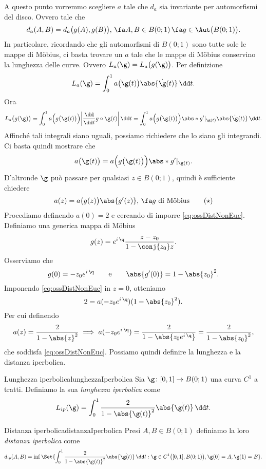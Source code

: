 \begin{oss}
	A questo punto vorremmo scegliere \(a\) tale che \(d_a\) sia invariante per automorfismi del disco. Ovvero tale che
	\[
		d_a(A,B) = d_a\big(g(A),g(B)\big),\,\fa A,B\in B(0;1)\,\fa g\in\Aut\big(B(0;1)\big).
	\]
	In particolare, ricordando che gli automorfismi di \(B(0;1)\) sono tutte sole le mappe di M\"obius, ci basta trovare un \(a\) tale che le mappe di M\"obius conservino la lunghezza delle curve. Ovvero \(L_a(\g)=L_a\big(g(\g)\big)\).
	Per definizione
	\[
		L_a(\g) = \int_0^1 a\big(\g(t)\big)\abs{\dot{\g}(t)}\,\dd t.
	\]
	Ora
	\[
		L_a\big(g(\g)\big) = \int_0^1 a\Big(g\big(\g(t)\big)\Big) \bigg\lvert \frac{\dd}{\dd t} g\circ \g(t) \bigg\rvert\,\dd t = \int_0^1 a\Big(g\big(\g(t)\big)\Big) \abs*{g'|_{\g(t)}}\abs{\dot{\g}(t)}\,\dd t.
	\]
	Affinché tali integrali siano uguali, possiamo richiedere che lo siano gli integrandi. Ci basta quindi mostrare che
	\[
		a\big(\g(t)\big) = a\Big(g\big(\g(t)\big)\Big)\abs*{g'|_{\g(t)}}.
	\]
	D'altronde \(\g\) può passare per qualsiasi \(z\in B(0;1)\), quindi è sufficiente chiedere
	\begin{equation*}\label{eq:ossDistNonEuc}
		a(z) = a\big(g(z)\big)\abs{g'(z)},\,\fa g\text{ di M\"obius}\tag{\(\star\)}
	\end{equation*}
	Procediamo definendo \(a(0)=2\) e cercando di imporre \eqref{eq:ossDistNonEuc}. Definiamo una generica mappa di M\"obius
	\[
		g(z) = e^{i\,\q} \frac{z-z_0}{1-\conj{z_0}z}.
	\]
	Osserviamo che
	\[
		g(0) = -z_0 e^{i\,\q} \qquad\text{e}\qquad \abs{g'(0)} = 1-\abs{z_0}^2.
	\]
	Imponendo \eqref{eq:ossDistNonEuc} in \(z=0\), otteniamo
	\[
		2 = a(-z_0 e^{i\,\q})(1-\abs{z_0}^2).
	\]
	Per cui definendo
	\[
		a(z) = \frac{2}{1-\abs{z}^2} \implies a(-z_0 e^{i\,\q}) = \frac{2}{1-\abs{z_0 e^{i\,\q}}} = \frac{2}{1-\abs{z_0}^2},
	\]
	che soddisfa \eqref{eq:ossDistNonEuc}.
	Possiamo quindi definire la lunghezza e la distanza iperbolica.
\end{oss}

\begin{defn}{Lunghezza iperbolica}{lunghezzaIperbolica}
	Sia \(\g\colon[0,1] \to B(0;1)\) una curva \(C^1\) a tratti. Definiamo la sua \emph{lunghezza iperbolica} come
	\[
		L_{ip}(\g) = \int_0^1 \frac{2}{1-\abs{\g(t)}^2}\abs{\dot{\g(t)}}\,\dd t.
	\]
\end{defn}

\begin{defn}{Distanza iperbolica}{distanzaIperbolica}
	Presi \(A,B\in B(0;1)\) definiamo la loro \emph{distanza iperbolica} come
	\[
		d_{ip}(A,B) = \inf\Set{\int_0^1 \frac{2}{1-\abs{\g(t)}^2}\abs{\dot{\g(t)}}\,\dd t : \g\in C^1\big([0,1],B(0;1)\big), \g(0)=A,\g(1)=B}.
	\]
\end{defn}

